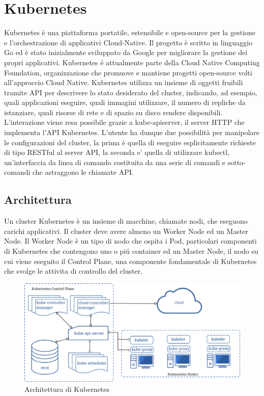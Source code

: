 
\section{Kubernetes}
Kubernetes è una piattaforma portatile, estensibile e open-source per la gestione e l'orchestrazione di applicativi Cloud-Native.
Il progetto è scritto in linguaggio Go ed è stato inizialmente sviluppato da Google per migliorare la gestione dei propri applicativi. Kubernetes é attualmente parte della Cloud Native Computing Foundation, organizzazione che promuove e mantiene progetti open-source volti all'approccio Cloud Native.
Kubernetes utilizza un insieme di oggetti fruibili tramite API per descrivere lo stato desiderato del cluster, indicando, ad esempio, quali applicazioni eseguire, quali immagini utilizzare, il numero di repliche da istanziare, quali risorse di rete e di spazio su disco rendere disponibili. L'interazione viene resa possibile grazie a kube-apiserver, il server HTTP che implementa l'API Kubernetes. L'utente ha dunque due possibilità per manipolare le configurazioni del cluster, la prima è quella di eseguire esplicitamente richieste di tipo RESTful al server API, la seconda e' quella di utilizzare kubectl, un'interfaccia da linea di comando costituita da una serie di comandi e sotto-comandi che astraggono le chiamate API.
\subsection{Architettura}
Un cluster Kubernetes è un insieme di macchine, chiamate nodi, che eseguono carichi applicativi. Il cluster deve avere almeno un Worker Node ed un Master Node. Il Worker Node è un tipo di nodo che ospita i Pod, particolari componenti di Kubernetes che contengono uno o piú container ed un Master Node, il nodo su cui viene eseguito il Control Plane, una componente fondamentale di Kubernetes che svolge le attivita di controllo del cluster.


\begin{figure}[H]
 \centering
 \includegraphics[width=1.0\textwidth]{./Figure/Kubernetes_Architettura.png}
 \caption{Architettura di Kubernetes}
 \label{fig:Architettura}
\end{figure}

